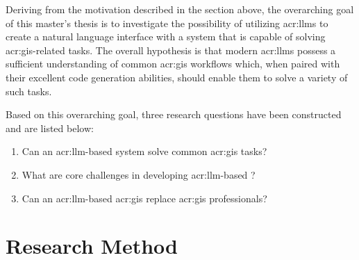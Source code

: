 \begin{comment}
For a Specialisation Project, the goal would primarily be to get up to speed with the research field, so the research questions will rather be
limited to exploring what the state-of-the-art is, what methods and data have been used, etc.
A secondary goal of the specialisation is to frame the research questions and goals of the Master's Thesis.
Note that a major difference between the Specialisation Project and the Master's Thesis is that the Master's Thesis work \textit{has\/} to
introduce new research.
Of course the Specialisation Project can also introduce novel work, but there is no such requirement --- and most commonly it does not,
since the core of the project really is to figure out what is ``old'' before you can introduce something which is new.
\end{comment}

Deriving from the motivation described in the section above, the overarching goal of this master's thesis is to investigate the possibility of utilizing \glspl{acr:llm} to create a natural language interface with a system that is capable of solving \acrshort{acr:gis}-related tasks. The overall hypothesis is that modern \glspl{acr:llm} possess a sufficient understanding of common \acrshort{acr:gis} workflows which, when paired with their excellent code generation abilities, should enable them to solve a variety of such tasks.

Based on this overarching goal, three research questions have been constructed and are listed below:

\begin{enumerate}
    \item Can an \gls{acr:llm}-based system solve common \acrshort{acr:gis} tasks? \label{rq:gis-question-answering}
    \item What are core challenges in developing \acrshort{acr:llm}-based ? \label{rq:development-challenges}
    \item Can an \acrshort{acr:llm}-based \acrshort{acr:gis} replace \acrshort{acr:gis} professionals? \label{rq:replaing-gis-professionals}
\end{enumerate}

\section{Research Method}
\label{sec:research-method}

\begin{comment}
What methodology will you apply to address the goals: theoretic/analytic, model/abstraction or design/experiment?
This section will describe the research methodology applied and the reason for this choice of research methodology.
You should return to the actual choices made in the work and the alternatives in the Discussion chapter.
\end{comment}

